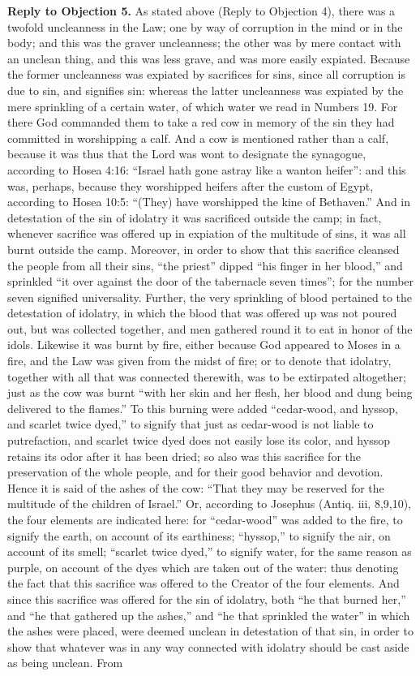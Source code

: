 \textbf{Reply to Objection 5.} As stated above (Reply to Objection 4), there was a twofold uncleanness in the Law; one by way of corruption in the mind or in the body; and this was the graver uncleanness; the other was by mere contact with an unclean thing, and this was less grave, and was more easily expiated. Because the former uncleanness was expiated by sacrifices for sins, since all corruption is due to sin, and signifies sin: whereas the latter uncleanness was expiated by the mere sprinkling of a certain water, of which water we read in Numbers 19. For there God commanded them to take a red cow in memory of the sin they had committed in worshipping a calf. And a cow is mentioned rather than a calf, because it was thus that the Lord was wont to designate the synagogue, according to Hosea 4:16: ``Israel hath gone astray like a wanton heifer'': and this was, perhaps, because they worshipped heifers after the custom of Egypt, according to Hosea 10:5: ``(They) have worshipped the kine of Bethaven.'' And in detestation of the sin of idolatry it was sacrificed outside the camp; in fact, whenever sacrifice was offered up in expiation of the multitude of sins, it was all burnt outside the camp. Moreover, in order to show that this sacrifice cleansed the people from all their sins, ``the priest'' dipped ``his finger in her blood,'' and sprinkled ``it over against the door of the tabernacle seven times''; for the number seven signified universality. Further, the very sprinkling of blood pertained to the detestation of idolatry, in which the blood that was offered up was not poured out, but was collected together, and men gathered round it to eat in honor of the idols. Likewise it was burnt by fire, either because God appeared to Moses in a fire, and the Law was given from the midst of fire; or to denote that idolatry, together with all that was connected therewith, was to be extirpated altogether; just as the cow was burnt ``with her skin and her flesh, her blood and dung being delivered to the flames.'' To this burning were added ``cedar-wood, and hyssop, and scarlet twice dyed,'' to signify that just as cedar-wood is not liable to putrefaction, and scarlet twice dyed does not easily lose its color, and hyssop retains its odor after it has been dried; so also was this sacrifice for the preservation of the whole people, and for their good behavior and devotion. Hence it is said of the ashes of the cow: ``That they may be reserved for the multitude of the children of Israel.'' Or, according to Josephus (Antiq. iii, 8,9,10), the four elements are indicated here: for ``cedar-wood'' was added to the fire, to signify the earth, on account of its earthiness; ``hyssop,'' to signify the air, on account of its smell; ``scarlet twice dyed,'' to signify water, for the same reason as purple, on account of the dyes which are taken out of the water: thus denoting the fact that this sacrifice was offered to the Creator of the four elements. And since this sacrifice was offered for the sin of idolatry, both ``he that burned her,'' and ``he that gathered up the ashes,'' and ``he that sprinkled the water'' in which the ashes were placed, were deemed unclean in detestation of that sin, in order to show that whatever was in any way connected with idolatry should be cast aside as being unclean. From 